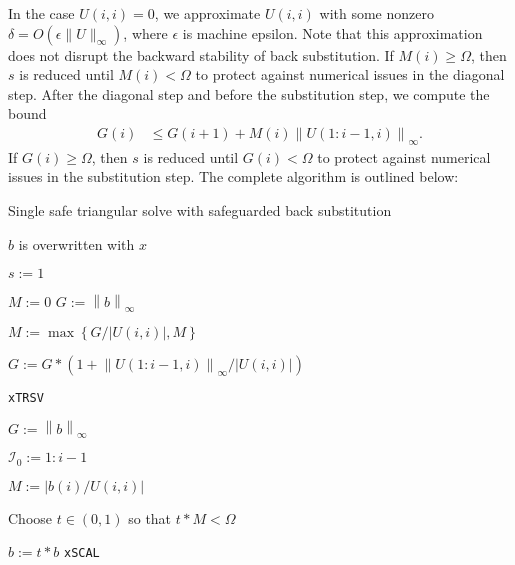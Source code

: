 \documentclass{article}
\begin{document}
In the case \(U(i,i)=0\), we approximate \(U(i,i)\) with some nonzero
\(\delta=O(\epsilon \lVert U\rVert_\infty)\), where \(\epsilon\) is
machine epsilon. Note that this approximation does not disrupt the
backward stability of back substitution.  If \(M(i)\geq \Omega\), then
\(s\) is reduced until \(M(i) < \Omega\) to protect against numerical
issues in the diagonal step. After the diagonal step and before the
substitution step, we compute the bound
\begin{align}
  G(i)
  &\leq G(i+1) + M(i) \left\lVert U(1:i-1,i) \right\rVert_\infty.
\end{align}
If \(G(i)\geq \Omega\), then \(s\) is reduced until \(G(i) < \Omega\)
to protect against numerical issues in the substitution step.  The
complete algorithm is outlined below:
\begin{algorithm}[H]
  \caption{Single safe triangular solve with safeguarded back substitution}
  \label{algorithm:safe trsv}
  \begin{algorithmic}
    
    \Comment \(b\) is overwritten with \(x\)
    
    \State \(s := 1\)
    
    \State \(M := 0\)
    \State \(G := \left\lVert b \right\rVert_\infty \)



    \State \( M := \max\left\lbrace G /\left|U(i,i)\right|, M \right\rbrace\)

    \State \( G := G * \left( 1 + \left\lVert U(1:i-1,i) \right\rVert_\infty/\left| U(i,i) \right| \right) \)

    \EndFor
    

    \State {} \Comment \texttt{xTRSV}

    \Else

    \State \(G := \left\lVert b \right\rVert_\infty\)


    \State \(\mathcal{I}_0 := 1:i-1\)

    \State \(M := \left|{b(i)}/{U(i,i)}\right|\) 


    \State Choose \(t\in\left(0,1\right)\) so that \(t* M< \Omega\)

    \State \(b := t * b\) \Comment \texttt{xSCAL}


\end{algorithmic}
\end{algorithm}
\end{document}
